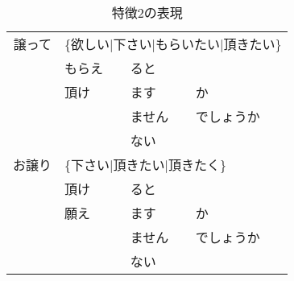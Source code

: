 \begin{table}
\caption{特徴2の表現}
\label{table:yuzutte}
\begin{center} \small
\begin{tabular}{|r|l|l|l|} \hline
譲って & \multicolumn{3}{l|}{\{欲しい$|$下さい$|$もらいたい$|$頂きたい\}} \\
\cline{2-4}
       & もらえ & \multicolumn{2}{l|}{ると} \\ \cline{3-4}
       & 頂け   & ます & か \\
       &        & ません & でしょうか \\ 
       &        & ない  &  \\ \hline
お譲り & \multicolumn{3}{l|}{\{下さい$|$頂きたい$|$頂きたく\}} \\
\cline{2-4}
       & 頂け   & \multicolumn{2}{l|}{ると} \\ \cline{3-4}
       & 願え   & ます & か \\
       &        & ません & でしょうか \\ 
       &        & ない &  \\ \hline
\end{tabular}
\end{center}
\end{table}

